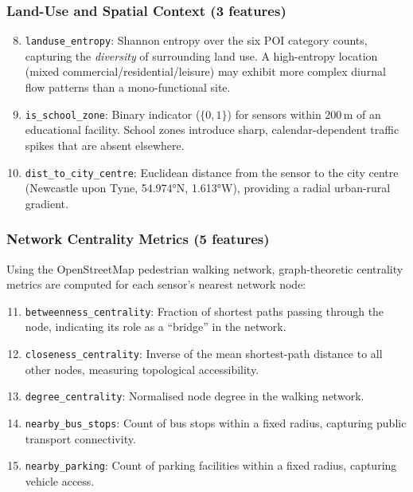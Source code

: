 \subsubsection{Land-Use and Spatial Context (3 features)}

\begin{enumerate}
    \setcounter{enumi}{7}
    \item \texttt{landuse\_entropy}: Shannon entropy over the six POI category counts, capturing the \emph{diversity} of surrounding land use. A high-entropy location (mixed commercial/residential/leisure) may exhibit more complex diurnal flow patterns than a mono-functional site.
    \item \texttt{is\_school\_zone}: Binary indicator ($\{0, 1\}$) for sensors within 200\,m of an educational facility. School zones introduce sharp, calendar-dependent traffic spikes that are absent elsewhere.
    \item \texttt{dist\_to\_city\_centre}: Euclidean distance from the sensor to the city centre (Newcastle upon Tyne, 54.974°N, 1.613°W), providing a radial urban-rural gradient.
\end{enumerate}

\subsubsection{Network Centrality Metrics (5 features)}

Using the OpenStreetMap pedestrian walking network, graph-theoretic centrality metrics are computed for each sensor's nearest network node:

\begin{enumerate}
    \setcounter{enumi}{10}
    \item \texttt{betweenness\_centrality}: Fraction of shortest paths passing through the node, indicating its role as a ``bridge'' in the network.
    \item \texttt{closeness\_centrality}: Inverse of the mean shortest-path distance to all other nodes, measuring topological accessibility.
    \item \texttt{degree\_centrality}: Normalised node degree in the walking network.
    \item \texttt{nearby\_bus\_stops}: Count of bus stops within a fixed radius, capturing public transport connectivity.
    \item \texttt{nearby\_parking}: Count of parking facilities within a fixed radius, capturing vehicle access.
\end{enumerate}

